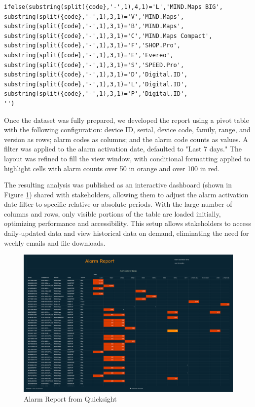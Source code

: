 \begin{lstlisting}[caption={Family calculated field}]
ifelse(substring(split({code},'-',1),4,1)='L','MIND.Maps BIG',
substring(split({code},'-',1),3,1)='V','MIND.Maps',
substring(split({code},'-',1),3,1)='B','MIND.Maps',
substring(split({code},'-',1),3,1)='C','MIND.Maps Compact',
substring(split({code},'-',1),3,1)='F','SHOP.Pro',
substring(split({code},'-',1),3,1)='E','Evereo',
substring(split({code},'-',1),3,1)='S','SPEED.Pro',
substring(split({code},'-',1),3,1)='D','Digital.ID',
substring(split({code},'-',1),3,1)='L','Digital.ID',
substring(split({code},'-',1),3,1)='P','Digital.ID',
'')
\end{lstlisting}

Once the dataset was fully prepared, we developed the report using a pivot table with the following configuration: device ID, serial, device code, family, range, and version as rows; alarm codes as columns; and the alarm code counts as values. A filter was applied to the alarm activation date, defaulted to "Last 7 days." The layout was refined to fill the view window, with conditional formatting applied to highlight cells with alarm counts over 50 in orange and over 100 in red.

The resulting analysis was published as an interactive dashboard (shown in Figure \ref{fig:alarmreportquick}) shared with stakeholders, allowing them to adjust the alarm activation date filter to specific relative or absolute periods. With the large number of columns and rows, only visible portions of the table are loaded initially, optimizing performance and accessibility. This setup allows stakeholders to access daily-updated data and view historical data on demand, eliminating the need for weekly emails and file downloads.

\begin{figure}[H]
    \centering
    \includegraphics[width=1\textwidth]{res/alarm_report.pdf}
    \caption{Alarm Report from Quicksight}
    \label{fig:alarmreportquick}
\end{figure}

